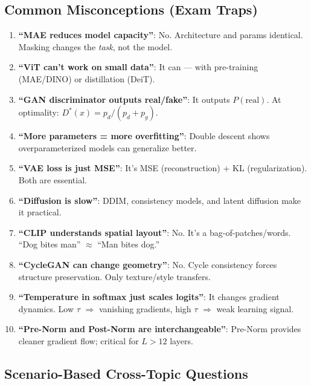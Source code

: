 \subsection{Common Misconceptions (Exam Traps)}
\begin{enumerate}
\item \textbf{``MAE reduces model capacity''}: No. Architecture and params identical. Masking changes the \emph{task}, not the model.
\item \textbf{``ViT can't work on small data''}: It can — with pre-training (MAE/DINO) or distillation (DeiT).
\item \textbf{``GAN discriminator outputs real/fake''}: It outputs $P(\text{real})$. At optimality: $D^*(x) = p_d/(p_d+p_g)$.
\item \textbf{``More parameters = more overfitting''}: Double descent shows overparameterized models can generalize better.
\item \textbf{``VAE loss is just MSE''}: It's MSE (reconstruction) + KL (regularization). Both are essential.
\item \textbf{``Diffusion is slow''}: DDIM, consistency models, and latent diffusion make it practical.
\item \textbf{``CLIP understands spatial layout''}: No. It's a bag-of-patches/words. ``Dog bites man'' $\approx$ ``Man bites dog.''
\item \textbf{``CycleGAN can change geometry''}: No. Cycle consistency forces structure preservation. Only texture/style transfers.
\item \textbf{``Temperature in softmax just scales logits''}: It changes gradient dynamics. Low $\tau$ $\Rightarrow$ vanishing gradients, high $\tau$ $\Rightarrow$ weak learning signal.
\item \textbf{``Pre-Norm and Post-Norm are interchangeable''}: Pre-Norm provides cleaner gradient flow; critical for $L > 12$ layers.
\end{enumerate}

\subsection{Scenario-Based Cross-Topic Questions}

